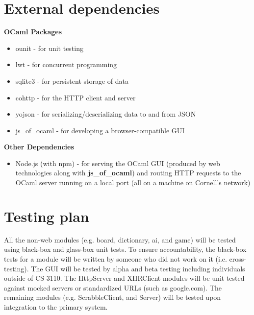 \documentclass[2pt]{journal}
\begin{document}
\section{External dependencies}
\textbf{OCaml Packages}
\begin{itemize}
    \item ounit - for unit testing
    \item lwt - for concurrent programming
    \item sqlite3 - for persistent storage of data
    \item cohttp - for the HTTP client and server
    \item yojson - for serializing/deserializing data to and from JSON
    \item js\_of\_ocaml - for developing a browser-compatible GUI
\end{itemize}
\textbf{Other Dependencies}
\begin{itemize}
    \item Node.js (with npm) - for serving the OCaml GUI (produced by web technologies along with \textbf{js\_of\_ocaml}) and routing HTTP requests to the OCaml server running on a local port (all on a machine on Cornell's network)
\end{itemize}

\section{Testing plan}
All the non-web modules (e.g. board, dictionary, ai, and game) will be tested using black-box and glass-box unit tests. To ensure accountability, the black-box tests for a module will be written by someone who did not work on it (i.e. cross-testing). The GUI will be tested by alpha and beta testing including individuals outside of CS 3110. The HttpServer and XHRClient modules will be unit tested against mocked servers or standardized URLs (such as google.com). The remaining modules (e.g. ScrabbleClient, and Server) will be  tested upon integration to the primary system.
\end{document}
